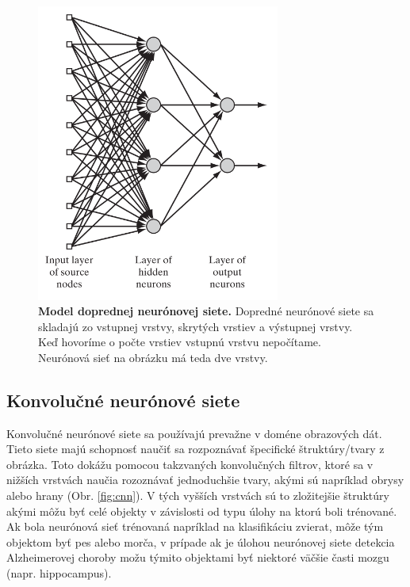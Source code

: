 \begin{figure}[h!]
    \centering
    \includegraphics[width=8cm]{assets/images/ff_nn.png}
    \caption{\textbf{Model doprednej neurónovej siete.} \cite{haykin2009neural} Dopredné neurónové siete sa skladajú zo vstupnej vrstvy, skrytých vrstiev a výstupnej vrstvy. Keď hovoríme o počte vrstiev vstupnú vrstvu nepočítame. Neurónová sieť na obrázku má teda dve vrstvy.}
    \label{fig:ff_nn}
\end{figure}

\subsection{Konvolučné neurónové siete}

Konvolučné neurónové siete sa používajú prevažne v doméne obrazových dát. Tieto siete majú schopnosť naučiť sa rozpoznávať špecifické štruktúry/tvary z obrázka. Toto dokážu pomocou takzvaných konvolučných filtrov, ktoré sa v nižších vrstvách naučia rozoznávať jednoduchšie tvary, akými sú napríklad obrysy alebo hrany (Obr. \ref{fig:cnn}). V tých vyšších vrstvách sú to zložitejšie štruktúry akými môžu byť celé objekty v závislosti od typu úlohy na ktorú boli trénované. Ak bola neurónová sieť trénovaná napríklad na klasifikáciu zvierat, môže tým objektom byť pes alebo morča, v prípade ak je úlohou neurónovej siete detekcia Alzheimerovej choroby možu týmito objektami byť niektoré väčšie časti mozgu (napr. hippocampus).

